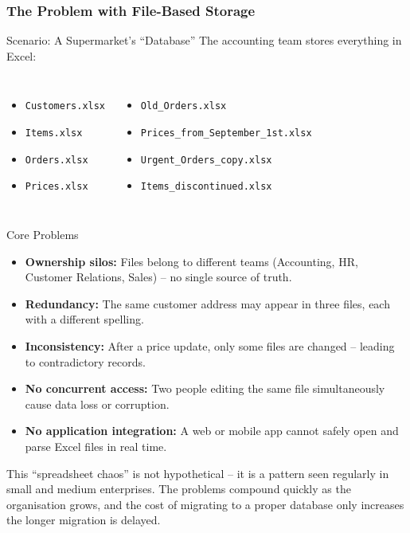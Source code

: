 \begin{frame}
  \frametitle{The Problem with File-Based Storage}

  \begin{examples}{Scenario: A Supermarket's ``Database''}
    The accounting team stores everything in Excel:
    \vspace{0.3em}
    \begin{columns}
        \begin{itemize}
          \item \texttt{Customers.xlsx}
          \item \texttt{Items.xlsx}
          \item \texttt{Orders.xlsx}
          \item \texttt{Prices.xlsx}
        \end{itemize}
        \begin{itemize}
          \item \texttt{Old\_Orders.xlsx}
          \item \texttt{Prices\_from\_September\_1st.xlsx}
          \item \texttt{Urgent\_Orders\_copy.xlsx}
          \item \texttt{Items\_discontinued.xlsx}
        \end{itemize}
    \end{columns}
  \end{examples}

  \vspace{0.5em}
  \begin{alertblock}{Core Problems}
    \begin{itemize}
      \item \textbf{Ownership silos:} Files belong to different teams (Accounting, HR, Customer Relations, Sales) -- no single source of truth.
      \item \textbf{Redundancy:} The same customer address may appear in three files, each with a different spelling.
      \item \textbf{Inconsistency:} After a price update, only some files are changed -- leading to contradictory records.
      \item \textbf{No concurrent access:} Two people editing the same file simultaneously cause data loss or corruption.
      \item \textbf{No application integration:} A web or mobile app cannot safely open and parse Excel files in real time.
    \end{itemize}
  \end{alertblock}

  This ``spreadsheet chaos'' is not hypothetical -- it is a pattern seen regularly in small and medium enterprises. The problems compound quickly as the organisation grows, and the cost of migrating to a proper database only increases the longer migration is delayed.
\end{frame}

